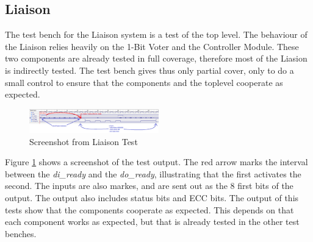 \documentclass[a4paper]{IEEEtran}
\begin{document}
\subsection{ Liaison }
The test bench for the Liaison system is a test of the top level.
The behaviour of the Liaison relies heavily on the 1-Bit Voter and the Controller Module.
These two components are already tested in full coverage, therefore most of the Liasion is indirectly tested.
The test bench gives thus only partial cover, only to do a small control to ensure that the components and the toplevel cooperate as expected.

\begin{figure}[h!]
    \centering
    \includegraphics[width=0.5\textwidth]{Figures/Tests/LiaisonTest}
    \caption{Screenshot from Liaison Test}
    \label{fig:LiaisonTests}
\end{figure}

Figure \ref{fig:LiaisonTests} shows a screenshot of the test output.
The red arrow marks the interval between the \textit{di\_ready} and the \textit{do\_ready}, illustrating that the first activates the second.
The inputs are also markes, and are sent out as the 8 first bits of the output.
The output also includes status bits and ECC bits.
The output of this tests show that the components cooperate as expected.
This depends on that each component works as expected, but that is already tested in the other test benches.
\end{document}
